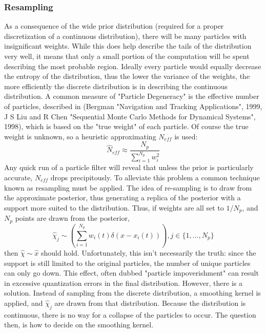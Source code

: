 \documentclass{article}
\begin{document}
\subsubsection{Resampling}
\label{Sub:Resampling}
As a consequence 
of the wide prior distribution (required for a proper discretization of a continuous
distribution), there will be many particles with insignificant weights. While this does help
describe the tails of the distribution very well, it means that only a small portion of the
computation will be spent describing the most probable region. Ideally every particle would 
equally decrease the entropy of the distribution, thus the lower the variance of the weights,
the more efficiently the discrete distribution is in describing the continuous distribution. 
A common measure of "Particle Degeneracy" is the effective number of particles, described
in (Bergman "Navigation and Tracking Applications", 1999, J S Liu and R Chen "Sequential 
Monte Carlo Methods for Dynamical Systems", 1998), which is based on the "true weight"
of each particle. Of course the true weight is unknown, so a heuristic approximating 
$N_{eff}$ is used:
\begin{equation}
\label{neff}
\hat{N}_{eff} \approx \frac{N_p}{\sum_{i=1}^{N_p} w_i^2}
\end{equation}
Any quick run of a particle filter will reveal that unless the prior is particularly accurate,
$N_{eff}$ drops precipitously.  To alleviate this problem
a common technique known as resampling must be applied. The idea of re-sampling is to 
draw from the approximate posterior, thus generating a replica of the posterior with 
a support more suited to the distribution. Thus, if weights are all set to $1/N_p$, and 
$N_p$ points are drawn from the posterior,
\begin{equation}
\hat{\chi}_j \sim \left(\sum_{i=1}^{N_p} w_i(t)\delta(x - x_i(t))\right), j \in \{1, ..., N_p\}
\end{equation}
then $\hat{\chi} \sim \hat{x}$ should hold. Unfortunately, this isn't necessarily the truth: since the support is
still limited to the original particles, the number of unique particles can only go down.
This effect, often dubbed "particle impoverishment" can result in excessive quantization
errors in the final distribution. However, there is a solution. Instead of sampling from the
discrete distribution, a smoothing kernel is applied, and $\hat{\chi}_j$ are drawn from
that distribution. Because the distribution is continuous, there is no way for a collapse
of the particles to occur. The question then, is how to decide on the smoothing kernel. 
\end{document}
